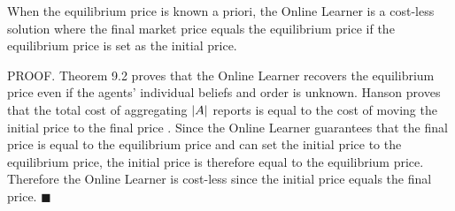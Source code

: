 \begin{theorem}
When the equilibrium price is known a priori, the Online Learner is a cost-less solution where the final market price equals the equilibrium price if the equilibrium price is set as the initial price.
\end{theorem}

PROOF. Theorem 9.2 proves that the Online Learner recovers the equilibrium price even if the agents' individual beliefs and order is unknown. Hanson proves that the total cost of aggregating $|A|$ reports is equal to the cost of moving the initial price to the final price \cite{Hanson2003}. Since the Online Learner guarantees that the final price is equal to the equilibrium price and can set the initial price to the equilibrium price, the initial price is therefore equal to the equilibrium price. Therefore the Online Learner is cost-less since the initial price equals the final price. $\blacksquare$\\ 